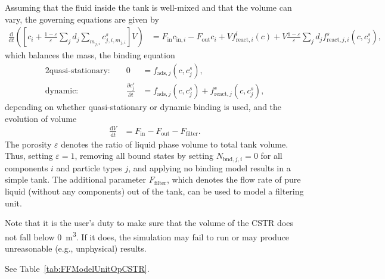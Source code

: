 Assuming that the fluid inside the tank is well-mixed and that the volume can vary, the governing equations are given by
\begin{align*}
	\frac{\mathrm{d}}{\mathrm{d}t} \left(\left[ c_i + \frac{1-\varepsilon}{\varepsilon} \sum_j d_j \sum_{m_{j,i}} c^s_{j,i,m_{j,i}} \right] V\right) &= F_{\text{in}} c_{\text{in},i} - F_{\text{out}} c_i + V f_{\text{react},i}^l\left( c \right) + V \frac{1-\varepsilon}{\varepsilon}\sum_j d_j f_{\text{react},j,i}^s\left( c, c_j^s \right),
\end{align*}
which balances the mass, the binding equation
\begin{alignat*}{2}
	\text{quasi-stationary: }& & 0 &= f_{\text{ads},j}\left( c, c^s_j\right), \\
	\text{dynamic: }& & \frac{\partial c^s_j}{\partial t} &= f_{\text{ads},j}\left( c, c^s_j\right) + f_{\text{react},j}^s\left( c, c_j^s \right),
\end{alignat*}
depending on whether quasi-stationary or dynamic binding is used, and the evolution of volume
\begin{align*}
	\frac{\mathrm{d}V}{\mathrm{d}t} &= F_{\text{in}} - F_{\text{out}} - F_{\text{filter}}.
\end{align*}
The porosity $\varepsilon$ denotes the ratio of liquid phase volume to total tank volume.
Thus, setting $\varepsilon = 1$, removing all bound states by setting $N_{\text{bnd},j,i} = 0$ for all components $i$ and particle types $j$, and applying no binding model results in a simple tank.
The additional parameter $F_{\text{filter}}$, which denotes the flow rate of pure liquid (without any components) out of the tank, can be used to model a filtering unit.

Note that it is the user's duty to make sure that the volume of the CSTR does not fall below \SI{0}{\cubic\metre}.
If it does, the simulation may fail to run or may produce unreasonable (e.g., unphysical) results.

See Table~\ref{tab:FFModelUnitOpCSTR}.
